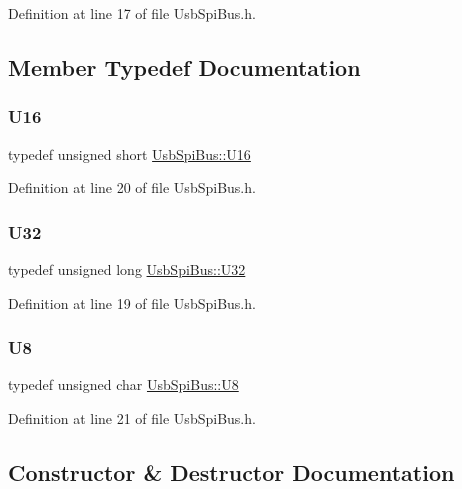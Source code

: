 Definition at line 17 of file Usb\+Spi\+Bus.\+h.



\subsection{Member Typedef Documentation}
\mbox{\label{classUsbSpiBus_a741e3c698b080973693ceb990017a560}} 
\subsubsection{\texorpdfstring{U16}{U16}}
{\footnotesize\ttfamily typedef unsigned short \hyperlink{classUsbSpiBus_a741e3c698b080973693ceb990017a560}{Usb\+Spi\+Bus\+::\+U16}}



Definition at line 20 of file Usb\+Spi\+Bus.\+h.

\mbox{\label{classUsbSpiBus_a9b24e28662a35ca57f5ed32c41c5f3ff}} 
\subsubsection{\texorpdfstring{U32}{U32}}
{\footnotesize\ttfamily typedef unsigned long \hyperlink{classUsbSpiBus_a9b24e28662a35ca57f5ed32c41c5f3ff}{Usb\+Spi\+Bus\+::\+U32}}



Definition at line 19 of file Usb\+Spi\+Bus.\+h.

\mbox{\label{classUsbSpiBus_a11336f4ad104fbd4fb454be044f19fc8}} 
\subsubsection{\texorpdfstring{U8}{U8}}
{\footnotesize\ttfamily typedef unsigned char \hyperlink{classUsbSpiBus_a11336f4ad104fbd4fb454be044f19fc8}{Usb\+Spi\+Bus\+::\+U8}}



Definition at line 21 of file Usb\+Spi\+Bus.\+h.



\subsection{Constructor \& Destructor Documentation}
\mbox{\label{classUsbSpiBus_a75b47c1938d8ee80eb3a32f19765b05e}} 
